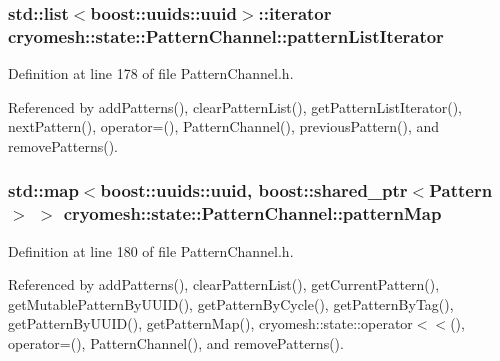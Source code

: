 \hypertarget{classcryomesh_1_1state_1_1PatternChannel_ac06b2bd5e0bc4aa4da633bc80a64b290}{
\subsubsection[{pattern\-List\-Iterator}]{\setlength{\rightskip}{0pt plus 5cm}std\-::list$<$boost\-::uuids\-::uuid$>$\-::iterator {\bf cryomesh\-::state\-::\-Pattern\-Channel\-::pattern\-List\-Iterator}}}\label{classcryomesh_1_1state_1_1PatternChannel_ac06b2bd5e0bc4aa4da633bc80a64b290}


\-Definition at line 178 of file \-Pattern\-Channel.\-h.



\-Referenced by add\-Patterns(), clear\-Pattern\-List(), get\-Pattern\-List\-Iterator(), next\-Pattern(), operator=(), \-Pattern\-Channel(), previous\-Pattern(), and remove\-Patterns().

\hypertarget{classcryomesh_1_1state_1_1PatternChannel_a72f70fbaad5ff134b07c3fe198d9fd67}{
\subsubsection[{pattern\-Map}]{\setlength{\rightskip}{0pt plus 5cm}std\-::map$<$boost\-::uuids\-::uuid, boost\-::shared\-\_\-ptr$<${\bf \-Pattern}$>$ $>$ {\bf cryomesh\-::state\-::\-Pattern\-Channel\-::pattern\-Map}}}\label{classcryomesh_1_1state_1_1PatternChannel_a72f70fbaad5ff134b07c3fe198d9fd67}


\-Definition at line 180 of file \-Pattern\-Channel.\-h.



\-Referenced by add\-Patterns(), clear\-Pattern\-List(), get\-Current\-Pattern(), get\-Mutable\-Pattern\-By\-U\-U\-I\-D(), get\-Pattern\-By\-Cycle(), get\-Pattern\-By\-Tag(), get\-Pattern\-By\-U\-U\-I\-D(), get\-Pattern\-Map(), cryomesh\-::state\-::operator$<$$<$(), operator=(), \-Pattern\-Channel(), and remove\-Patterns().

